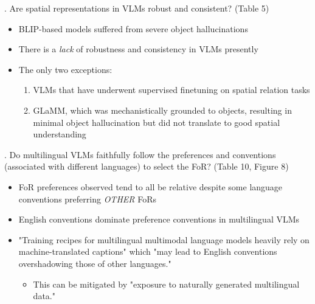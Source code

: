 \documentclass[12pt, letterpaper]{article}
\begin{document}
\begin{spacing}{1.10}
. Are spatial representations in VLMs robust and consistent? (Table 5)
\begin{itemize}
    \item BLIP-based models suffered from severe object hallucinations
    \item There is a \emph{lack} of robustness and consistency in VLMs presently
    \item The only two exceptions:
    \begin{enumerate}
        \item VLMs that have underwent supervised finetuning on spatial relation tasks
        \item GLaMM, which was mechanistically grounded to objects, resulting in minimal object hallucination but did not translate to good spatial understanding
    \end{enumerate}
\end{itemize}

. Do multilingual VLMs faithfully follow the preferences and conventions (associated with different languages) to select the FoR? (Table 10, Figure 8)
\begin{itemize}
    \item FoR preferences observed tend to all be relative despite some language conventions preferring \emph{OTHER} FoRs
    \item English conventions dominate preference conventions in multilingual VLMs
    \item "Training recipes for multilingual multimodal language models heavily rely on machine-translated captions" which "may lead to English conventions overshadowing those of other languages."
    \begin{itemize}
        \item This can be mitigated by "exposure to naturally generated multilingual data."
    \end{itemize}
\end{itemize}


\end{spacing}
\end{document}
